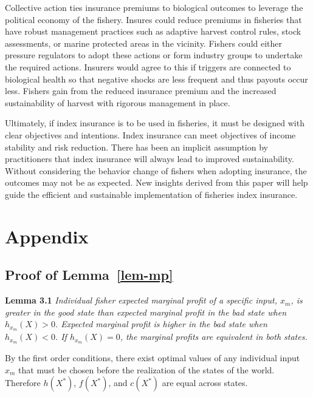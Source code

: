\documentclass[
  letterpaper,
  DIV=11,
  numbers=noendperiod]{scrartcl}
\theoremstyle{plain}
\theoremstyle{plain}
\theoremstyle{remark}
\begin{document}
Collective action ties insurance premiums to biological outcomes to
leverage the political economy of the fishery. Insures could reduce
premiums in fisheries that have robust management practices such as
adaptive harvest control rules, stock assessments, or marine protected
areas in the vicinity. Fishers could either pressure regulators to adopt
these actions or form industry groups to undertake the required actions.
Insurers would agree to this if triggers are connected to biological
health so that negative shocks are less frequent and thus payouts occur
less. Fishers gain from the reduced insurance premium and the increased
sustainability of harvest with rigorous management in place.

Ultimately, if index insurance is to be used in fisheries, it must be
designed with clear objectives and intentions. Index insurance can meet
objectives of income stability and risk reduction. There has been an
implicit assumption by practitioners that index insurance will always
lead to improved sustainability. Without considering the behavior change
of fishers when adopting insurance, the outcomes may not be as expected.
New insights derived from this paper will help guide the efficient and
sustainable implementation of fisheries index insurance.

\newpage
\appendix
\renewcommand{\thefigure}{A\arabic{figure}}
\renewcommand{\thetable}{A\arabic{table}}
\setcounter{figure}{0}
\setcounter{table}{0}

\hypertarget{appendix}{%
\section{Appendix}\label{appendix}}

\hypertarget{proof-of-lem-mp}{%
\subsection{\texorpdfstring{Proof of
Lemma~\ref{lem-mp}}{Proof of Lemma~}}\label{proof-of-lem-mp}}

\textbf{Lemma 3.1} \emph{Individual fisher expected marginal profit of a
specific input, \(x_m\), is greater in the good state than expected
marginal profit in the bad state when \(h_{x_m}(X)>0\). Expected
marginal profit is higher in the bad state when \(h_{x_m}(X)<0\). If
\(h_{x_m}(X)=0\), the marginal profits are equivalent in both states.}

By the first order conditions, there exist optimal values of any
individual input \(x_m\) that must be chosen before the realization of
the states of the world. Therefore \(h(X^*)\), \(f(X^*)\), and
\(c(X^*)\) are equal across states.
\end{document}

